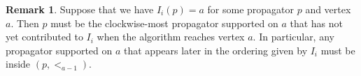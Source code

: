\documentclass[11pt]{article}
\newcommand{\cP}{\mathcal{P}}
\theoremstyle{remark}
\theoremstyle{definition}
\newtheorem{dfn}[thm]{Definition}
\newtheorem{rmk}[thm]{Remark}
\begin{document}
%


\begin{rmk} \label{clockwise ordering rem}
Suppose that we have $I_i(p) = a$ for some propagator $p$ and vertex $a$. Then $p$ must be the clockwise-most propagator supported on $a$ that has not yet contributed to $I_i$ when the algorithm reaches vertex $a$. In particular, any propagator supported on $a$ that appears later in the ordering given by $I_i$ must be inside $(p, <_{a-1})$.
\end{rmk} 
\end{document}
